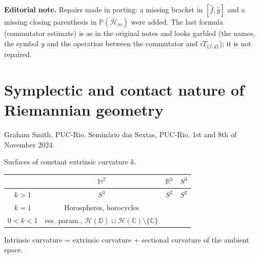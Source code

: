 \medskip\noindent
{\bf Editorial note.} Repairs made in
porting: a missing bracket in
$[\hat{f},\hat{g}]$ and a missing closing
parenthesis in
$\mathbb{P}(\overline{\mathcal{H}}_m)$
were added. The last formula (commutator
estimate) is as in the original notes and
looks garbled (the names, the symbol $y$
and the operation between the commutator
and $iT_{\{f,g\}}$); it is not repaired.

\section{Symplectic and contact nature of
Riemannian geometry}
\label{section-symplectic-contact-riemannian}

\noindent
Graham Smith, PUC-Rio.
Seminário das Sextas, PUC-Rio.
1st and 8th of November 2024.

\medskip
Surfaces of constant extrinsic curvature $k$.

\begin{center}
\begin{tabular}{c |c| c| c}
& $\mathbb{H}^2$ & $\mathbb{R}^3$ & $S^3$ \\
\hline
$k>1$ & $S^3$ & $S^2$ & $S^2$ \\
$k=1$ & Horospheres, horocycles & & \\
$0<k<1$ & ess. param.,
$\mathcal{H}(\mathbb{D})\sqcup
\mathcal{H}(\mathbb{C})\setminus
\{\mathbb{C}\}$
\end{tabular}
\end{center}

\begin{remark}
\label{remark-smith-curvatures}
Intrinsic curvature = extrinsic curvature +
sectional curvature of the ambient space.
\end{remark}

